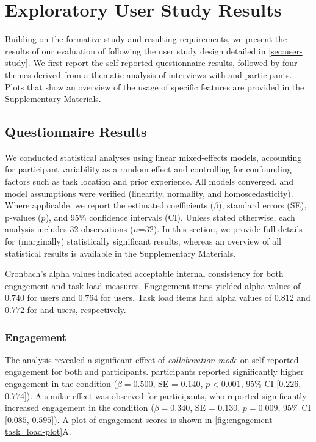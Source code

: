\section{Exploratory User Study Results}
Building on the formative study and resulting requirements, we present the results of our evaluation of \SystemName following the user study design detailed in \cref{sec:user-study}. We first report the self-reported questionnaire results, followed by four themes derived from a thematic analysis of interviews with \exsitu and \insitu participants. Plots that show an overview of the usage of specific \SystemName features are provided in the Supplementary Materials.

\subsection{Questionnaire Results}
We conducted statistical analyses using linear mixed-effects models, accounting for participant variability as a random effect and controlling for confounding factors such as task location and prior experience. All models converged, and model assumptions were verified (linearity, normality, and homoscedasticity). Where applicable, we report the estimated coefficients ($\beta$), standard errors (SE), p-values ($p$), and 95\% confidence intervals (CI). Unless stated otherwise, each analysis includes 32 observations ($n$=32). In this section, we provide full details for (marginally) statistically significant results, whereas an overview of all statistical results is available in the Supplementary Materials.

Cronbach's alpha values indicated acceptable internal consistency for both engagement and task load measures. Engagement items yielded alpha values of $0.740$ for \insitu users and $0.764$ for \exsitu users. Task load items had alpha values of $0.812$ and $0.772$ for \insitu and \exsitu users, respectively.

\subsubsection{Engagement}
The analysis revealed a significant effect of \textit{collaboration mode} on self-reported engagement for both \exsitu and \insitu participants. \Exsitu participants reported significantly higher engagement in the \sync condition ($\beta = 0.500$, SE = $0.140$, $p < 0.001$, 95\% CI [$0.226$, $0.774$]). A similar effect was observed for \insitu participants, who reported significantly increased engagement in the \sync condition ($\beta = 0.340$, SE = $0.130$, $p = 0.009$, 95\% CI [$0.085$, $0.595$]). A plot of engagement scores is shown in \cref{fig:engagement-task_load-plot}A.

